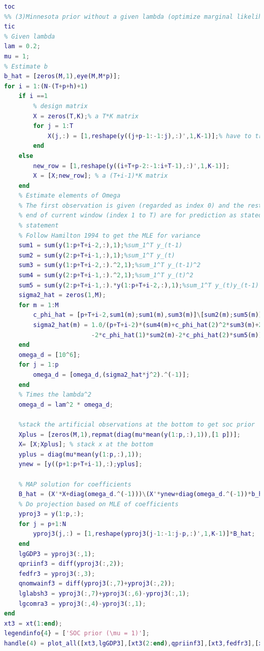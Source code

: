 \documentclass[11pt, oneside]{article}   	%
\begin{document}
\begin{lstlisting}[language=Matlab ,caption={Matlab code for problem 2.}, label={code:prob2}]
toc
%% (3)Minnesota prior without a given lambda (optimize marginal likelihood to get lambda each time)
tic
% Given lambda
lam = 0.2;
mu = 1;
% Estimate b
b_hat = [zeros(M,1),eye(M,M*p)];
for i = 1:(N-(T+p+h)+1)
    if i ==1
        % design matrix
        X = zeros(T,K);% a T*K matrix
        for j = 1:T
            X(j,:) = [1,reshape(y((j+p-1:-1:j),:)',1,K-1)];% have to transpose because the reshape function operate in column
        end
    else
        new_row = [1,reshape(y((i+T+p-2:-1:i+T-1),:)',1,K-1)];
        X = [X;new_row]; % a (T+i-1)*K matrix
    end
    % Estimate elements of Omega
    % The first observation is given (regarded as index 0) and the rest of observation up to the
    % end of current window (index 1 to T) are for prediction as stated in the problem
    % statement
    % Follow Hamilton 1994 to get the MLE for variance
    sum1 = sum(y(1:p+T+i-2,:),1);%sum_1^T y_(t-1)
    sum2 = sum(y(2:p+T+i-1,:),1);%sum_1^T y_(t)
    sum3 = sum(y(1:p+T+i-2,:).^2,1);%sum_1^T y_(t-1)^2
    sum4 = sum(y(2:p+T+i-1,:).^2,1);%sum_1^T y_(t)^2
    sum5 = sum(y(2:p+T+i-1,:).*y(1:p+T+i-2,:),1);%sum_1^T y_(t)y_(t-1)
    sigma2_hat = zeros(1,M);
    for m = 1:M
        c_phi_hat = [p+T+i-2,sum1(m);sum1(m),sum3(m)]\[sum2(m);sum5(m)];% c_phi_hat = [c_hat,phi_hat]
        sigma2_hat(m) = 1.0/(p+T+i-2)*(sum4(m)+c_phi_hat(2)^2*sum3(m)+2*c_phi_hat(1)*c_phi_hat(2)*sum1(m)...
                        -2*c_phi_hat(1)*sum2(m)-2*c_phi_hat(2)*sum5(m))+c_phi_hat(1)^2;
    end
    omega_d = [10^6];
    for j = 1:p
        omega_d = [omega_d,(sigma2_hat*j^2).^(-1)];
    end
    % Times the lambda^2
    omega_d = lam^2 * omega_d;
    
    %stack the artificial observations at the bottom to get soc prior
    Xplus = [zeros(M,1),repmat(diag(mu*mean(y(1:p,:),1)),[1 p])];    
    X= [X;Xplus]; % stack x at the bottom
    yplus = diag(mu*mean(y(1:p,:),1));
    ynew = [y((p+1:p+T+i-1),:);yplus];
    
    % MAP solution for coefficients
    B_hat = (X'*X+diag(omega_d.^(-1)))\(X'*ynew+diag(omega_d.^(-1))*b_hat');% a K*M matrix
    % Do projection based on MLE of coefficients
    yproj3 = y(1:p,:);
    for j = p+1:N
        yproj3(j,:) = [1,reshape(yproj3(j-1:-1:j-p,:)',1,K-1)]*B_hat; 
    end
    lgGDP3 = yproj3(:,1);
    qpriinf3 = diff(yproj3(:,2));
    fedfr3 = yproj3(:,3);
    qnomwainf3 = diff(yproj3(:,7)+yproj3(:,2));
    lglabsh3 = yproj3(:,7)+yproj3(:,6)-yproj3(:,1);
    lgcomra3 = yproj3(:,4)-yproj3(:,1);
end
xt3 = xt(1:end);
legendinfo{4} = ['SOC prior (\mu = 1)'];
handle(4) = plot_all([xt3,lgGDP3],[xt3(2:end),qpriinf3],[xt3,fedfr3],[xt3(2:end),qnomwainf3],[xt3,lglabsh3],[xt3,lgcomra3],'-.m','SOC prior (\mu = 1)');


\end{lstlisting}
\end{document}
